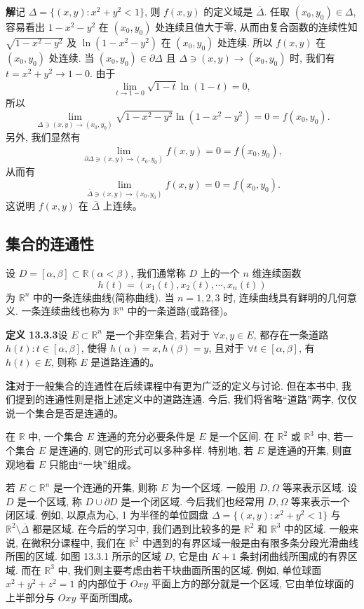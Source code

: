\documentclass[UTF8,12pt,a4paper,fontset=fandol]{ctexart}
\begin{document}
\noindent\textbf{解}\quad 记 $\Delta=\{(x,y):x^2+y^2<1\}$, 则 $f(x,y)$ 的定义域是 $\overline\Delta$. 任取 $(x_0,y_0)\in\Delta$, 容易看出 $1-x^2-y^2$ 在 $(x_0,y_0)$ 处连续且值大于零, 从而由复合函数的连续性知 $\sqrt{1-x^2-y^2}$ 及 $\ln(1-x^2-y^2)$ 在 $(x_0,y_0)$ 处连续. 所以 $f(x,y)$ 在 $(x_0,y_0)$ 处连续. 当 $(x_0,y_0)\in\partial\Delta$ 且 $\Delta\ni(x,y)\to(x_0,y_0)$ 时, 我们有 $t=x^2+y^2\to1-0$. 由于
\[
  \lim_{t\to1-0}\sqrt{1-t}\ln(1-t)=0,
\]
所以
\[
  \lim_{\Delta\ni(x,y)\to(x_0,y_0)}
  \sqrt{1-x^2-y^2}\ln(1-x^2-y^2)=0=f(x_0,y_0).
\]
另外, 我们显然有
\[
  \lim_{\partial\Delta\ni(x,y)\to(x_0,y_0)}f(x,y)=0=f(x_0,y_0),
\]
从而有
\[
  \lim_{\overline\Delta\ni(x,y)\to(x_0,y_0)}f(x,y)=0=f(x_0,y_0).
\]
这说明 $f(x,y)$ 在 $\overline\Delta$ 上连续。

\subsection{集合的连通性}

设 $D=[\alpha,\beta]\subset\mathbb R(\alpha<\beta)$, 我们通常称 $D$ 上的一个 $n$ 维连续函数
\[
  h(t)=(x_1(t),x_2(t),\cdots,x_n(t))
\]
为 $\mathbb R^n$ 中的一条连续曲线(简称曲线). 当 $n=1,2,3$ 时, 连续曲线具有鲜明的几何意义. 一条连续曲线也称为 $\mathbb R^n$ 中的一条道路(或路径)。

\noindent\textbf{定义 13.3.3}\quad 设 $E\subset\mathbb R^n$ 是一个非空集合, 若对于 $\forall x,y\in E$, 都存在一条道路 $h(t):t\in[\alpha,\beta]$, 使得 $h(\alpha)=x,h(\beta)=y$, 且对于 $\forall t\in[\alpha,\beta]$, 有 $h(t)\in E$, 则称 $E$ 是道路连通的。

\noindent\textbf{注}\quad 对于一般集合的连通性在后续课程中有更为广泛的定义与讨论. 但在本书中, 我们提到的连通性则是指上述定义中的道路连通. 今后, 我们将省略``道路''两字, 仅仅说一个集合是否是连通的。

在 $\mathbb R$ 中, 一个集合 $E$ 连通的充分必要条件是 $E$ 是一个区间. 在 $\mathbb R^2$ 或 $\mathbb R^3$ 中, 若一个集合 $E$ 是连通的, 则它的形式可以多种多样. 特别地, 若 $E$ 是连通的开集, 则直观地看 $E$ 只能由``一块''组成。

若 $E\subset\mathbb R^n$ 是一个连通的开集, 则称 $E$ 为一个区域. 一般用 $D,\Omega$ 等来表示区域. 设 $D$ 是一个区域, 称 $D\cup\partial D$ 是一个闭区域. 今后我们也经常用 $D,\Omega$ 等来表示一个闭区域. 例如, 以原点为心, 1 为半径的单位圆盘 $\Delta=\{(x,y):x^2+y^2<1\}$ 与 $\mathbb R^2\setminus\overline\Delta$ 都是区域. 在今后的学习中, 我们遇到比较多的是 $\mathbb R^2$ 和 $\mathbb R^3$ 中的区域. 一般来说, 在微积分课程中, 我们在 $\mathbb R^2$ 中遇到的有界区域一般是由有限多条分段光滑曲线所围的区域. 如图 13.3.1 所示的区域 $D$, 它是由 $K+1$ 条封闭曲线所围成的有界区域. 而在 $\mathbb R^3$ 中, 我们则主要考虑由若干块曲面所围的区域. 例如, 单位球面 $x^2+y^2+z^2=1$ 的内部位于 $Oxy$ 平面上方的部分就是一个区域, 它由单位球面的上半部分与 $Oxy$ 平面所围成。
\end{document}

